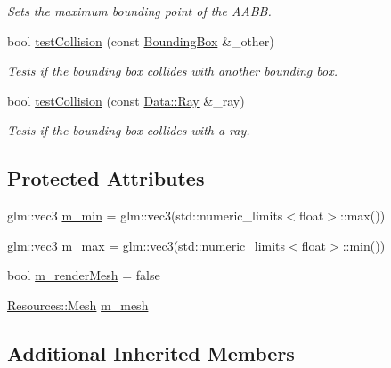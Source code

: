 \begin{DoxyCompactItemize}
\begin{DoxyCompactList}\small\item\em Sets the maximum bounding point of the A\+A\+BB. \end{DoxyCompactList}\item 
bool \hyperlink{class_cookie_eng_1_1_components_1_1_bounding_box_aa121d65a4271d524fefb153f7388421a}{test\+Collision} (const \hyperlink{class_cookie_eng_1_1_components_1_1_bounding_box}{Bounding\+Box} \&\+\_\+other)
\begin{DoxyCompactList}\small\item\em Tests if the bounding box collides with another bounding box. \end{DoxyCompactList}\item 
bool \hyperlink{class_cookie_eng_1_1_components_1_1_bounding_box_aebb0d8b30c7d24d9617b391434205769}{test\+Collision} (const \hyperlink{struct_cookie_eng_1_1_data_1_1_ray}{Data\+::\+Ray} \&\+\_\+ray)
\begin{DoxyCompactList}\small\item\em Tests if the bounding box collides with a ray. \end{DoxyCompactList}\end{DoxyCompactItemize}
\subsection*{Protected Attributes}
\begin{DoxyCompactItemize}
\item 
glm\+::vec3 \hyperlink{class_cookie_eng_1_1_components_1_1_bounding_box_ac09de9910abef58938d4c692c6a64855}{m\+\_\+min} = glm\+::vec3(std\+::numeric\+\_\+limits$<$float$>$\+::max())
\item 
glm\+::vec3 \hyperlink{class_cookie_eng_1_1_components_1_1_bounding_box_a2075e00805e700e3b24abe83dd26008c}{m\+\_\+max} = glm\+::vec3(std\+::numeric\+\_\+limits$<$float$>$\+::min())
\item 
bool \hyperlink{class_cookie_eng_1_1_components_1_1_bounding_box_a0378442f8184a6729d44c14a0be2f727}{m\+\_\+render\+Mesh} = false
\item 
\hyperlink{struct_cookie_eng_1_1_resources_1_1_mesh}{Resources\+::\+Mesh} \hyperlink{class_cookie_eng_1_1_components_1_1_bounding_box_a68294bec52783787ea0d91abfab773a7}{m\+\_\+mesh}
\end{DoxyCompactItemize}
\subsection*{Additional Inherited Members}



